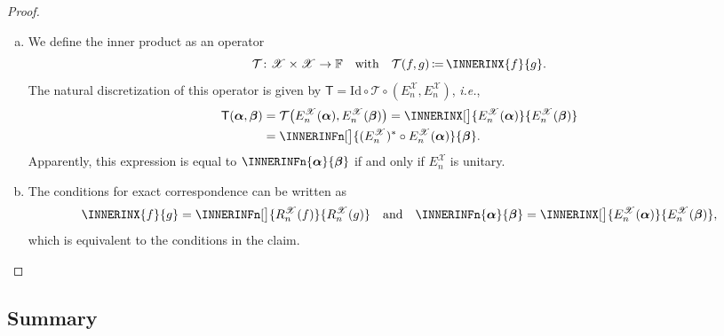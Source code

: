 \documentclass[a4paper]{paper}
\newcommand*{\SPC}[1]{{\ensuremath{\mathscr{#1}}}}
\newcommand*{\SPCX}{\SPC{X}}
\newcommand{\FIELD}{{\ensuremath{\mathbb{F}}}}
\newcommand*{\OP}[1]{{\ensuremath{\mathcal{#1}}}}
\newcommand*{\OPT}{\OP{T}}
\newcommand*{\OPID}{\OP{\mathrm{Id}}}
\newcommand{\DISCOP}[1]{{\ensuremath{\mathsf{#1}}}}
\newcommand*{\DISCOPT}{\DISCOP{T}}
\newcommand*{\EXT}[2]{\ensuremath{E_{#1}^{#2}}}
\newcommand*{\REST}[2]{\ensuremath{R_{#1}^{#2}}}
\newcommand*{\RnX}{{\ensuremath{\REST{n}{\SPC{X}}}}}
\newcommand*{\EnX}{{\ensuremath{\EXT{n}{\SPC{X}}}}}
\DeclareMathOperator{\DEFEQ}{{\coloneqq}}
\newcommand{\ie}{\textsl{i.e.}\xspace}
\newcommand{\valpha}{\boldsymbol{\alpha}}
\newcommand{\vbeta}{\boldsymbol{\beta}}
\begin{document}
\begin{proof}~
 \begin{enumerate}[(a)]
  \item We define the inner product as an operator
  \begin{equation*}
   \OPT \colon \SPCX \times \SPCX \to \FIELD
   \quad \text{with} \quad
   \OPT(f, g) \DEFEQ  \INNERINX{f}{g}.
  \end{equation*}
  The natural discretization of this operator is given by $\DISCOPT = \OPID \circ \OPT \circ (\EnX, \EnX)$, \ie,
  \begin{align*}
   \DISCOPT(\valpha, \vbeta) 
   &= \OPT\big( \EnX(\valpha), \EnX(\vbeta) \big) 
   = \INNERINX[\big]{\EnX(\valpha)}{\EnX(\vbeta)} \\
   &= \INNERINFn[\big]{(\EnX)^* \circ \EnX(\valpha)}{\vbeta}.
  \end{align*}
  Apparently, this expression is equal to $\INNERINFn{\valpha}{\vbeta}$ if and only if $\EnX$ is unitary.

  \item The conditions for exact correspondence can be written as
  \begin{equation*}
   \INNERINX{f}{g} = \INNERINFn[\big]{\RnX(f)}{\RnX(g)}
   \quad \text{and} \quad
   \INNERINFn{\valpha}{\vbeta} = \INNERINX[\big]{\EnX(\valpha)}{\EnX(\vbeta)},
  \end{equation*}
  which is equivalent to the conditions in the claim.
 \end{enumerate}
\end{proof}



\subsection{Summary}
\label{subsec:prop:summary}
\end{document}
